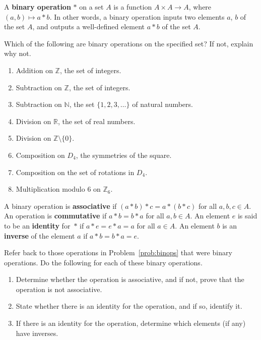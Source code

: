 \begin{definition}
    A \textbf{binary operation} \(*\) on a set \(A\) is a function \(A \times A \rightarrow A\), where \((a,b) \mapsto a*b\).  In other words, a binary operation inputs two elements \(a\), \(b\) of the set \(A\), and outputs a well-defined element \(a * b\) of the set \(A\).
\end{definition}

\begin{problem}\label{prob:binops}
Which of the following are binary operations on the specified set? If not, explain why not.
\begin{enumerate}
  \item Addition on \(\mathbb{Z}\), the set of integers.
  \item Subtraction on \(\mathbb{Z}\), the set of integers.
  \item Subtraction on \(\mathbb{N}\), the set \(\{1,2,3,\ldots\}\) of natural numbers.
  \item Division on \(\mathbb{R}\), the set of real numbers.
  \item Division on \(\mathbb{Z}\setminus \{0\}\).
  \item Composition on \(D_4\), the symmetries of the square.
  \item Composition on the set of rotations in \(D_4\).
  \item Multiplication modulo 6 on \(\mathbb{Z}_6\).
\end{enumerate}
\end{problem}

\begin{definition}
A binary operation is \textbf{associative} if \((a * b)*c = a*(b*c)\) for all \(a,b,c \in A\). An operation is \textbf{commutative} if \(a * b = b * a\) for all \(a,b \in A\). An element \(e\) is said to be an \textbf{identity} for~\(*\) if \(a*e = e*a = a\) for all \(a \in A\).
An element \(b\) is an \textbf{inverse} of the element \(a\) if \(a * b = b * a = e\).
\end{definition}

\begin{problem}
Refer back to those operations in Problem~\ref{prob:binops} that were binary operations.
Do the following for each of these binary operations.
\begin{enumerate}
  \item Determine whether the operation is associative, and if not, prove that the operation is not associative.
  \item State whether there is an identity for the operation, and if so, identify it.
  \item If there is an identity for the operation, determine which elements (if any) have inverses.
\end{enumerate}
\end{problem}

